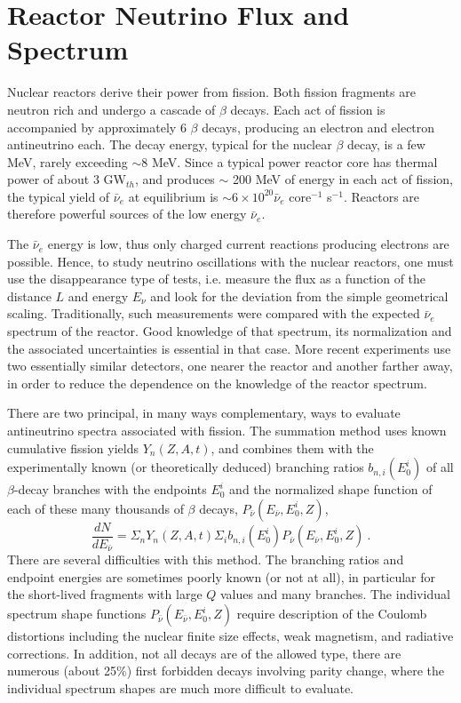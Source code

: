 \section{Reactor Neutrino Flux and Spectrum} 
\label{sec:flux}

Nuclear reactors derive their power from fission. Both fission fragments are neutron rich and undergo a cascade of $\beta$ decays. Each act of fission
is accompanied by approximately 6 $\beta$ decays, producing an electron and electron antineutrino each. The decay energy, typical for the nuclear
$\beta$ decay, is a few MeV, rarely exceeding $\sim$8 MeV. Since a typical power reactor core has thermal power of about 3 GW$_{th}$, and produces
$\sim$ 200 MeV of energy in each act of fission, the typical yield of $\bar{\nu}_e$ at equilibrium is $\sim 6 \times 10^{20} \bar{\nu}_e$ core$^{-1}$ s$^{-1}$.   
Reactors are therefore powerful sources of the low energy $\bar{\nu}_e$.

The $\bar{\nu}_e$ energy is low, thus  only charged current reactions producing electrons are possible. Hence, to study neutrino oscillations with
the nuclear reactors, one must use the disappearance type of tests, i.e. measure the flux as a function of the distance $L$ and energy $E_{\nu}$ and
look for the deviation from the simple geometrical scaling. Traditionally, such measurements were compared with the expected  $\bar{\nu}_e$ spectrum
of the reactor. Good knowledge of that spectrum, its normalization and the associated uncertainties is essential in that case.  More recent experiments
\cite{Dayabay,Reno} use two essentially similar detectors, one nearer the reactor and another farther away, in order to reduce the dependence on the
knowledge of the reactor spectrum.

There are two principal, in many ways complementary, ways to evaluate antineutrino spectra associated with fission. 
 The summation method uses known cumulative fission yields $Y_n (Z,A,t)$, and combines them
 with the experimentally known (or theoretically deduced) branching ratios $b_{n,i}(E^i_0)$ of all $\beta$-decay branches with the endpoints $E^i_0$ and the
 normalized shape function of each of these many thousands of $\beta$ decays, $P_{\bar{\nu}} (E_{\bar{\nu}},E^i_0,Z)$,
 \begin{equation}
 \frac{dN}{dE_{\bar{\nu}}} = \Sigma_n Y_n (Z,A,t) \Sigma_i b_{n,i}(E^i_0) P_{\bar{\nu}} (E_{\bar{\nu}},E^i_0,Z) ~.
 \end{equation}
 There are several difficulties with this method. The branching ratios and endpoint energies are sometimes poorly known (or not at all), in particular for
 the short-lived fragments with large $Q$ values and many branches. The individual spectrum shape functions $P_{\bar{\nu}} (E_{\bar{\nu}},E^i_0,Z)$
 require description of the Coulomb distortions including the nuclear finite size effects, weak magnetism, and radiative corrections. In addition, not all
 decays are of the allowed type, there are numerous (about 25\%) first forbidden decays involving parity change, where the individual spectrum 
 shapes are much more difficult to evaluate. 
 
